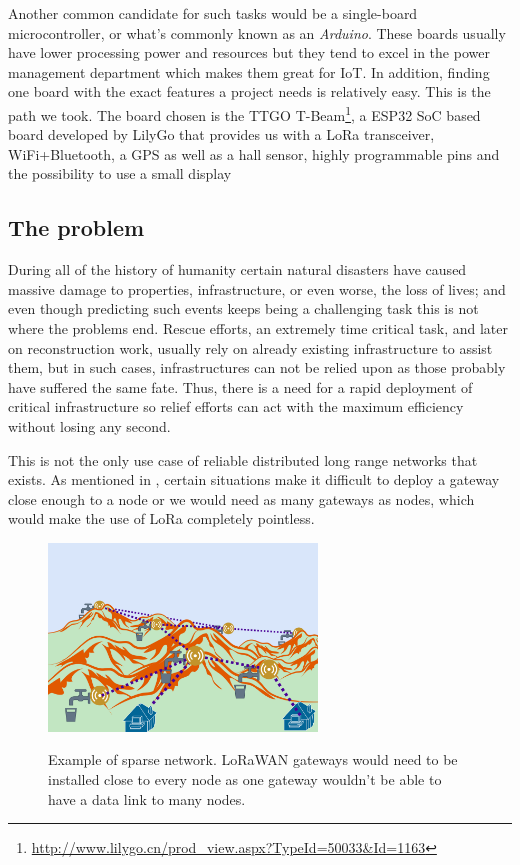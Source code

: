 Another common candidate for such tasks would be a single-board microcontroller, or what's commonly known as an \textit{Arduino}. These boards usually have lower processing power and resources but they tend to excel in the power management department which makes them great for IoT. In addition, finding one board with the exact features a project needs is relatively easy. This is the path we took. The board chosen is the TTGO T-Beam\footnote{\url{http://www.lilygo.cn/prod_view.aspx?TypeId=50033&Id=1163}}, a ESP32 SoC based board developed by LilyGo that provides us with a LoRa transceiver, WiFi+Bluetooth, a GPS as well as a hall sensor, highly programmable pins and the possibility to use a small display

\subsection{The problem}
During all of the history of humanity certain natural disasters have caused massive damage to properties, infrastructure, or even worse, the loss of lives; and even though predicting such events keeps being a challenging task this is not where the problems end. Rescue efforts, an extremely time critical task, and later on reconstruction work, usually rely on already existing infrastructure to assist them, but in such cases, infrastructures can not be relied upon as those probably have suffered the same fate. Thus, there is a need for a rapid deployment of critical infrastructure so relief efforts can act with the maximum efficiency without losing any second.\cite{LoRaMoto}

This is not the only use case of reliable distributed long range networks that exists. As mentioned in \cite{StarOfStars}, certain situations make it difficult to deploy a gateway close enough to a node or we would need as many gateways as nodes, which would make the use of LoRa completely pointless.


\begin{figure}[h]
        \centering
        \includegraphics[height=5cm]{Figures/MountainMesh.png}
        \caption[Example of sparse network]{Example of sparse network. LoRaWAN gateways would need to be installed close to every node as one gateway wouldn't be able to have a data link to many nodes.}
        \cite{StarOfStars}
        \label{fig:MountainMesh}
\end{figure}


